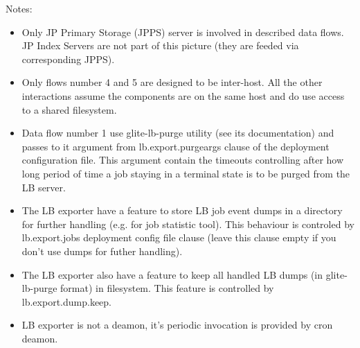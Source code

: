\documentclass{egee}
\begin{document}
Notes:
\begin{itemize}
 \item Only JP Primary Storage (JPPS) server is involved in described
   data flows. JP Index Servers are not part of this picture (they are
   feeded via corresponding JPPS).
 \item Only flows number 4 and 5 are designed to be inter-host. All
   the other interactions assume the components are on the same host and
   do use access to a shared filesystem.
 \item Data flow number 1 use glite-lb-purge utility (see its
   documentation) and passes to it argument from lb.export.purgeargs
   clause of the deployment configuration file. This argument contain
   the timeouts controlling after how long period of time a job
   staying in a terminal state is to be purged from the LB server.
 \item The LB exporter have a feature to store LB job event dumps in a
   directory for further handling (e.g. for job statistic tool). This behaviour
   is controled by lb.export.jobs deployment config file clause (leave
   this clause empty if you don't use dumps for futher handling).
 \item The LB exporter also have a feature to keep all handled LB
   dumps (in glite-lb-purge format) in filesystem. This feature is
   controlled by lb.export.dump.keep.
 \item LB exporter is not a deamon, it's periodic invocation is
   provided by cron deamon.
\end{itemize}
\end{document}
